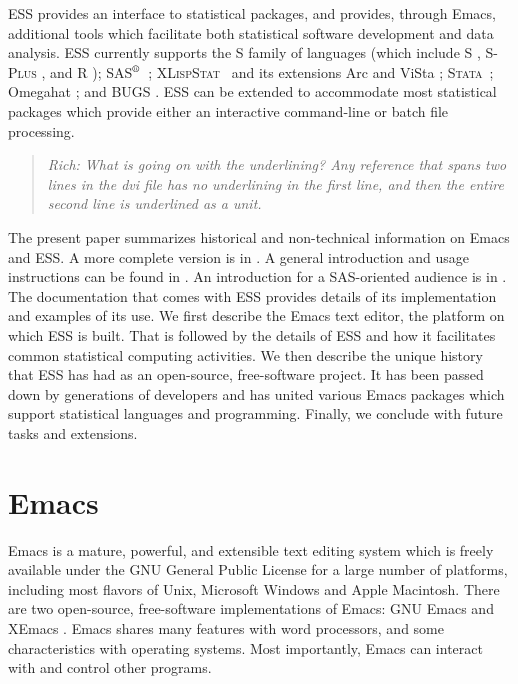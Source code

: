 \documentclass{article}
\newcommand*{\SAS}{\textsc{SAS}$^{\mbox{\scriptsize\textregistered}}$}
\newcommand*{\Splus}{\textsc{S-Plus}}
\newcommand*{\XLispStat}{\textsc{XLispStat}}
\newcommand*{\Stata}{\textsc{Stata}}
\newenvironment{Comment}{\begin{quote}\small\itshape }{\end{quote}}
\begin{document}
ESS provides an interface to statistical packages, and provides,
through Emacs, additional tools which facilitate both statistical
software development and data analysis.  ESS currently supports
the S family of languages (which include
S \citep{BecRCW88,ChaJH92,ChaJ98}, \Splus{} \citep{Splus}, and R
\citep{ihak:gent:1996}); \SAS\ \citep{SAS:8}; \XLispStat\
\citep{Tier90} and its extensions Arc \citep{Cook:Weisberg:1999} and
ViSta \citep{youn:fald:mcfa:1992}; \Stata\ \citep{Stata:6.0}; Omegahat
\citep{DTLang:2000}; and BUGS \citep{BUGS}.  ESS can be
extended to accommodate most statistical packages which provide either
an interactive command-line or batch file processing.
\begin{Comment}
  Rich: What is going on with the underlining?  Any reference that spans
two lines in the dvi file has no underlining in the first line, and then the
entire second line is underlined as a unit.
\end{Comment}

The present paper summarizes historical and non-technical information on
Emacs and ESS.  A more complete version is in \citep{RMHHS:2001}.
A general introduction and usage instructions can be
found in \citep{heiberger:dsc:2001}.
An introduction for a SAS-oriented audience is in
\citep{heiberger:philasugi:2001}.  The documentation that comes with
ESS provides details of its implementation and examples of its use.
We first describe the Emacs text editor, the platform on which ESS is
built.  That is followed by the details of ESS and how it facilitates
common statistical computing activities.  We then describe the unique
history that ESS has had as an open-source, free-software project.
It has been passed down by generations of developers and has
united various Emacs packages which support
statistical languages and programming.  Finally, we conclude with
future tasks and extensions.

\section{Emacs}
\label{sec:emacs}

Emacs is a mature, powerful, and extensible text editing system which
is freely available under the GNU General Public License for a large
number of platforms, including most flavors of Unix, Microsoft Windows
and Apple Macintosh.  There are two open-source, free-software
implementations of Emacs:  GNU Emacs \citep{GNU-Emacs} and XEmacs
\citep{XEmacs}.  Emacs shares many features with
word processors, and some characteristics with operating systems.
Most importantly, Emacs can interact with and control other programs.
\end{document}
